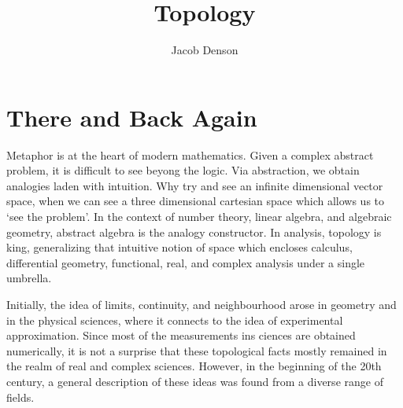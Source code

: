 

\DeclareMathOperator{\Dom}{Dom}

\title{Topology}
\author{Jacob Denson}




\maketitle

\tableofcontents


\chapter{There and Back Again}

Metaphor is at the heart of modern mathematics. Given a complex abstract problem, it is difficult to see beyong the logic. Via abstraction, we obtain analogies laden with intuition. Why try and see an infinite dimensional vector space, when we can see a three dimensional cartesian space which allows us to `see the problem'. In the context of number theory, linear algebra, and algebraic geometry, abstract algebra is the analogy constructor. In analysis, topology is king, generalizing that intuitive notion of space which encloses calculus, differential geometry, functional, real, and complex analysis under a single umbrella.

Initially, the idea of limits, continuity, and neighbourhood arose in geometry and in the physical sciences, where it connects to the idea of experimental approximation. Since most of the measurements ins ciences are obtained numerically, it is not a surprise that these topological facts mostly remained in the realm of real and complex sciences. However, in the beginning of the 20th century, a general description of these ideas was found from a diverse range of fields.

